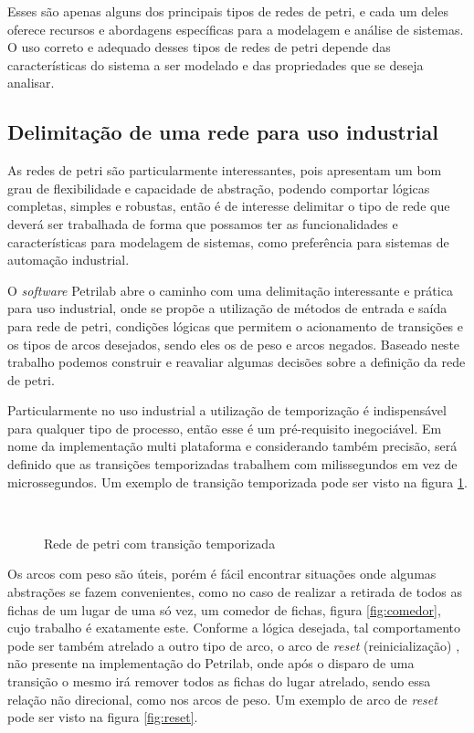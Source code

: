 Esses são apenas alguns dos principais tipos de redes de petri, e cada um deles oferece recursos e abordagens específicas para a modelagem e análise de sistemas. O uso correto e adequado desses tipos de redes de petri depende das características do sistema a ser modelado e das propriedades que se deseja analisar. 

\subsection{Delimitação de uma rede para uso industrial}

As redes de petri são particularmente interessantes, pois apresentam um bom grau de flexibilidade e capacidade de abstração, podendo comportar lógicas completas, simples e robustas, então é de interesse delimitar o tipo de rede que deverá ser trabalhada de forma que possamos ter as funcionalidades e características para modelagem de sistemas, como preferência para sistemas de automação industrial. 

O \textit{software} Petrilab \cite{de2015petrilab} abre o caminho com uma delimitação interessante e prática para uso industrial, onde se propõe a utilização de métodos de entrada e saída para rede de petri, condições lógicas que permitem o acionamento de transições e os tipos de arcos desejados, sendo eles os de peso e arcos negados. Baseado neste trabalho podemos construir e reavaliar algumas decisões sobre a definição da rede de petri. 

Particularmente no uso industrial a utilização de temporização é indispensável para qualquer tipo de processo, então esse é um pré-requisito inegociável. Em nome da implementação multi plataforma e considerando também precisão, será definido que as transições temporizadas trabalhem com milissegundos em vez de microssegundos. Um exemplo de transição temporizada pode ser visto na figura \ref{fig:petritime}. 

\begin{figure}[ht]
	\centering
	\caption{Rede de petri com transição temporizada}
	\\
	\label{fig:petritime}
\end{figure}

Os arcos com peso são úteis, porém é fácil encontrar situações onde algumas abstrações se fazem convenientes, como no caso de realizar a retirada de todos as fichas de um lugar de uma só vez, um comedor de fichas, figura \ref{fig:comedor}, cujo trabalho é exatamente este. Conforme a lógica desejada, tal comportamento pode ser também atrelado a outro tipo de arco, o arco de \textit{reset} (reinicialização) \cite{ResetNetsBetweenDecidabilityAndUndecidability}, não presente na implementação do Petrilab, onde após o disparo de uma transição o mesmo irá remover todos as fichas do lugar atrelado, sendo essa relação não direcional, como nos arcos de peso. Um exemplo de arco de \textit{reset} pode ser visto na figura \ref{fig:reset}. 


